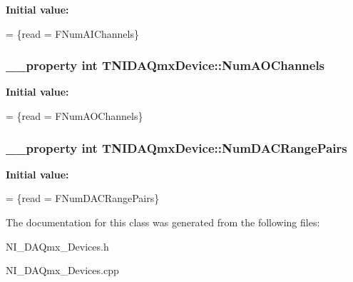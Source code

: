 {\bfseries Initial value\+:}
\begin{DoxyCode}
=
                \{read = FNumAIChannels\}
\end{DoxyCode}
\hypertarget{class_t_n_i_d_a_qmx_device_ac4a2bbde26c5ac68210b0946aa7595b6}{
\subsubsection[{Num\+A\+O\+Channels}]{\setlength{\rightskip}{0pt plus 5cm}\+\_\+\+\_\+property int T\+N\+I\+D\+A\+Qmx\+Device\+::\+Num\+A\+O\+Channels}}\label{class_t_n_i_d_a_qmx_device_ac4a2bbde26c5ac68210b0946aa7595b6}
{\bfseries Initial value\+:}
\begin{DoxyCode}
=
                \{read = FNumAOChannels\}
\end{DoxyCode}
\hypertarget{class_t_n_i_d_a_qmx_device_a22e761cbeef4652ebaacfd0dc1b9d813}{
\subsubsection[{Num\+D\+A\+C\+Range\+Pairs}]{\setlength{\rightskip}{0pt plus 5cm}\+\_\+\+\_\+property int T\+N\+I\+D\+A\+Qmx\+Device\+::\+Num\+D\+A\+C\+Range\+Pairs}}\label{class_t_n_i_d_a_qmx_device_a22e761cbeef4652ebaacfd0dc1b9d813}
{\bfseries Initial value\+:}
\begin{DoxyCode}
=
                \{read = FNumDACRangePairs\}
\end{DoxyCode}


The documentation for this class was generated from the following files\+:\begin{DoxyCompactItemize}
\item 
N\+I\+\_\+\+D\+A\+Qmx\+\_\+\+Devices.\+h\item 
N\+I\+\_\+\+D\+A\+Qmx\+\_\+\+Devices.\+cpp\end{DoxyCompactItemize}
